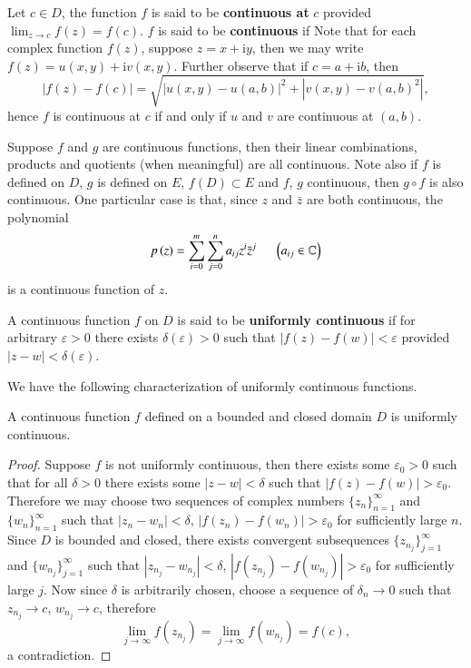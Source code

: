 Let $c\in D$, the function $f$ is said to be \textbf{continuous at} $c$ provided $\lim_{z\to c}f(z)=f(c)$. $f$ is said to be \textbf{continuous} if  Note that for each complex function $f(z)$, suppose $z=x+\mathrm{i}y$, then we may write $f(z)=u(x,y)+\mathrm{i}v(x,y)$. Further observe that if $c=a+\mathrm{i}b$, then
$$
\left| f\left( z \right) -f\left( c \right) \right|=\sqrt{\left| u\left( x,y \right) -u\left( a,b \right) \right|^2+\left| v\left( x,y \right) -v\left( a,b \right) ^2 \right|},
$$
hence $f$ is continuous at $c$ if and only if $u$ and $v$ are continuous at $(a,b)$.\par
Suppose $f$ and $g$ are continuous functions, then their linear combinations, products and quotients (when meaningful) are all continuous. Note also if $f$ is defined on $D$, $g$ is defined on $E$, $f(D)\subset E$ and $f$, $g$ continuous, then $g\circ f$ is also continuous. One particular case is that, since $z$ and $\bar{z}$ are both continuous, the polynomial 
$$
p\left( z \right) =\sum_{i=0}^m{\sum_{j=0}^n{a_{ij}z^i\bar{z}^j}}\hspace{0.5cm}\left( a_{ij}\in \mathbb{C} \right) 
$$
is a continuous function of $z$.
\begin{definition}
A continuous function $f$ on $D$ is said to be \textbf{uniformly continuous} if for arbitrary $\varepsilon>0$ there exists $\delta(\varepsilon)>0$ such that $|f(z)-f(w)|<\varepsilon$ provided $|z-w|<\delta(\varepsilon)$.
\end{definition}
We have the following characterization of uniformly continuous functions.
\begin{theorem}
A continuous function $f$ defined on a bounded and closed domain $D$ is uniformly continuous.
\end{theorem}
\begin{proof}
Suppose $f$ is not uniformly continuous, then there exists some $\varepsilon_0>0$ such that for all $\delta>0$ there exists some $|z-w|<\delta$ such that $|f(z)-f(w)|>\varepsilon_0$. Therefore we may choose two sequences of complex numbers $\{z_n\}_{n=1}^\infty$ and $\{w_n\}_{n=1}^\infty$ such that $|z_n-w_n|<\delta$, $|f(z_n)-f(w_n)|>\varepsilon_0$ for sufficiently large $n$. Since $D$ is bounded and closed, there exists convergent subsequences $\{z_{n_j}\}_{j=1}^\infty$ and $\{w_{n_j}\}_{j=1}^\infty$ such that $|z_{n_j}-w_{n_j}|<\delta$, $|f(z_{n_j})-f(w_{n_j})|>\varepsilon_0$ for sufficiently large $j$. Now since $\delta$ is arbitrarily chosen, choose a sequence of $\delta_n\to 0$ such that $z_{n_j}\to c$, $w_{n_j}\to c$, therefore 
$$
\lim_{j\rightarrow \infty} f\left( z_{n_j} \right) =\lim_{j\rightarrow \infty} f\left( w_{n_j} \right) =f\left( c \right) ,
$$
a contradiction.
\end{proof}